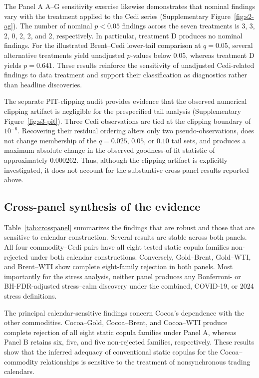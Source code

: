 The Panel A A--G sensitivity exercise likewise demonstrates that nominal findings vary with the treatment applied to the Cedi series (Supplementary Figure~\ref{fig:s2-ag}). The number of nominal $p<0.05$ findings across the seven treatments is 3, 3, 2, 0, 2, 2, and 2, respectively. In particular, treatment D produces no nominal findings. For the illustrated Brent--Cedi lower-tail comparison at $q=0.05$, several alternative treatments yield unadjusted $p$-values below 0.05, whereas treatment D yields $p=0.641$. These results reinforce the sensitivity of unadjusted Cedi-related findings to data treatment and support their classification as diagnostics rather than headline discoveries.

The separate PIT-clipping audit provides evidence that the observed numerical clipping artifact is negligible for the prespecified tail analysis (Supplementary Figure~\ref{fig:s3-pit}). Three Cedi observations are tied at the clipping boundary of $10^{-6}$. Recovering their residual ordering alters only two pseudo-observations, does not change membership of the $q=0.025$, $0.05$, or $0.10$ tail sets, and produces a maximum absolute change in the observed goodness-of-fit statistic of approximately $0.000262$. Thus, although the clipping artifact is explicitly investigated, it does not account for the substantive cross-panel results reported above.

\subsection{Cross-panel synthesis of the evidence}
\label{sec:results-synthesis}

Table~\ref{tab:crosspanel} summarizes the findings that are robust and those that are sensitive to calendar construction. Several results are stable across both panels. All four commodity--Cedi pairs have all eight tested static copula families non-rejected under both calendar constructions. Conversely, Gold--Brent, Gold--WTI, and Brent--WTI show complete eight-family rejection in both panels. Most importantly for the stress analysis, neither panel produces any Bonferroni- or BH-FDR-adjusted stress--calm discovery under the combined, COVID-19, or 2024 stress definitions.

The principal calendar-sensitive findings concern Cocoa's dependence with the other commodities. Cocoa--Gold, Cocoa--Brent, and Cocoa--WTI produce complete rejection of all eight static copula families under Panel A, whereas Panel B retains six, five, and five non-rejected families, respectively. These results show that the inferred adequacy of conventional static copulas for the Cocoa--commodity relationships is sensitive to the treatment of nonsynchronous trading calendars.


